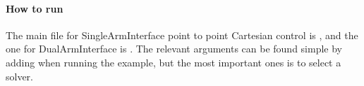 
\paragraph{How to run}
The main file for SingleArmInterface point to point Cartesian control is 
,
and the one for DualArmInterface is 
.
The relevant arguments can be found simple by adding
 when running the example,
but the most important ones is
 to select a solver.

